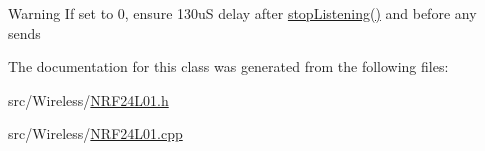\begin{DoxyWarning}{Warning}
If set to 0, ensure 130uS delay after \hyperlink{classNRF24L01_a6ad13189b732f237ac148c659ddf6b01}{stop\+Listening()} and before any sends 
\end{DoxyWarning}


The documentation for this class was generated from the following files\+:\begin{DoxyCompactItemize}
\item 
src/\+Wireless/\hyperlink{NRF24L01_8h}{N\+R\+F24\+L01.\+h}\item 
src/\+Wireless/\hyperlink{NRF24L01_8cpp}{N\+R\+F24\+L01.\+cpp}\end{DoxyCompactItemize}
